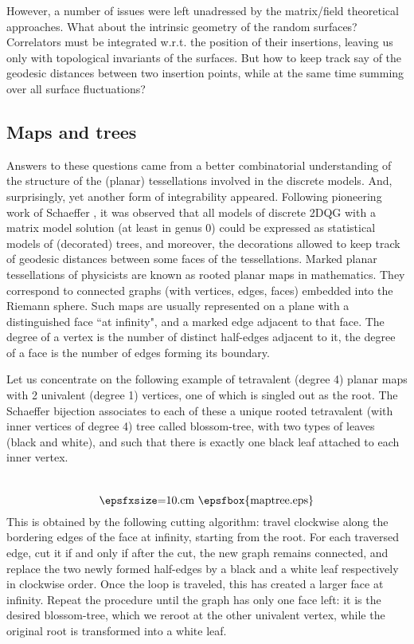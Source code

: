\documentclass[12pt]{amsart}
\numberwithin{equation}{section}
\begin{document}
However, a number of issues were left unadressed by the matrix/field theoretical approaches. What about the intrinsic
geometry of the random surfaces? Correlators must be integrated w.r.t. the position of their insertions, leaving us
only with topological invariants of the surfaces. But how to keep track say of the geodesic distances between two
insertion points, while at the same time summing over all surface fluctuations?

\subsection{Maps and trees}

Answers to these questions came from a better combinatorial understanding of the structure of the (planar) tessellations 
involved in the discrete models. And, surprisingly, yet another form of integrability appeared. Following pioneering
work of Schaeffer \cite{SCH}, it was observed that all models of discrete 2DQG with a matrix model solution 
(at least in genus 0) could be expressed as statistical models of (decorated) trees, and moreover, the decorations
allowed to keep track of geodesic distances between some faces of the tessellations. Marked planar tessellations of
physicists are known as rooted planar maps in mathematics. They correspond to connected graphs (with vertices, edges, faces)
embedded into the Riemann sphere. Such maps are usually represented on a plane with a distinguished face 
``at infinity", and a marked edge adjacent to that face. The degree of a vertex is the number of distinct half-edges
adjacent to it, the degree of a face is the number of edges forming its boundary.

Let us concentrate on the following example of tetravalent (degree 4) planar maps with 2 univalent (degree 1) vertices, 
one of which is singled out as the root.
The Schaeffer bijection associates to each of these a unique rooted tetravalent 
(with inner vertices of degree 4) tree called blossom-tree, with two types
of leaves (black and white), and such that there is exactly one black leaf attached to each inner vertex.
$$  \raisebox{-1.cm}{\hbox{\epsfxsize=10.cm \epsfbox{maptree.eps}}}$$
This is obtained by the following cutting algorithm: travel clockwise along the bordering edges of the face at infinity, starting from
the root. 
For each traversed edge, cut it if and only if after the cut, the new graph remains connected, 
and replace the two newly formed half-edges
by a black and a white leaf respectively in clockwise order. Once the loop is traveled, this has created a larger face at infinity.
Repeat the procedure until the graph has only one face left: it is the desired blossom-tree, which we reroot at the other
univalent vertex, while the original root is transformed into a white leaf. 
\end{document}

